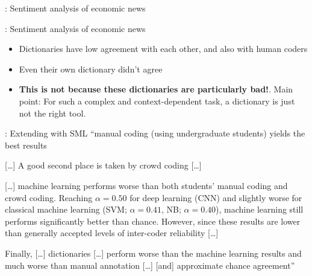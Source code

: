 \documentclass[compress]{beamer}
\begin{document}
\begin{frame}{\cite{Boukes2020}: Sentiment analysis of economic news}
\end{frame}


\begin{frame}{\cite{Boukes2020}: Sentiment analysis of economic news}
\begin{itemize}
	\item Dictionaries have low agreement with each other, and also with human coders
	\item Even their own dictionary didn't agree
	\item \textbf{This is not because these dictionaries are particularly bad!}. Main point: For such a complex and context-dependent task, a dictionary is just not the right tool.
\end{itemize}
\end{frame}




\begin{frame}{\cite{VanAtteveldt2021}: Extending \cite{Boukes2020} with SML}
``manual coding (using undergraduate students) yields the
best results 

[\ldots] A good second place is taken by crowd coding [\ldots]  


[\ldots] machine learning performs worse than both students' manual coding and crowd coding.
Reaching $\alpha = 0.50$ for deep learning (CNN) and slightly worse for classical machine learning (SVM; $\alpha = 0.41$, NB; $\alpha = 0.40$), machine learning still performs significantly better than chance. However, since these results are lower than generally accepted levels of inter-coder reliability [\ldots]

Finally, [\ldots] dictionaries [\ldots] perform worse than the machine
learning results and much worse than manual annotation [\ldots] [and] approximate chance agreement''\end{frame}
\end{document}
